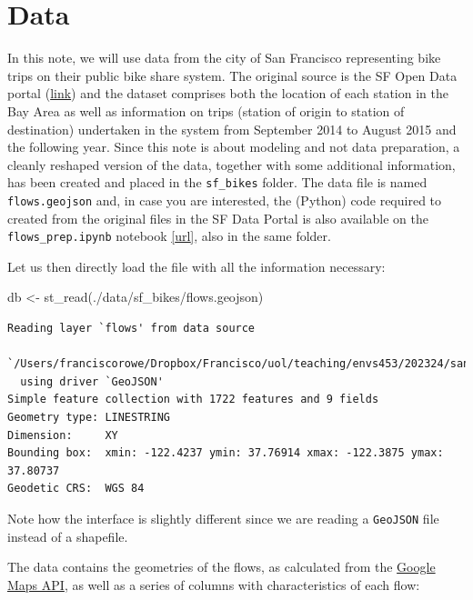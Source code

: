 \documentclass[
  letterpaper,
  DIV=11,
  numbers=noendperiod,
  oneside]{scrreprt}
\newenvironment{Shaded}{\begin{snugshade}}{\end{snugshade}}
\newcommand{\FunctionTok}[1]{\textcolor[rgb]{0.28,0.35,0.67}{#1}}
\newcommand{\NormalTok}[1]{\textcolor[rgb]{0.00,0.23,0.31}{#1}}
\newcommand{\OtherTok}[1]{\textcolor[rgb]{0.00,0.23,0.31}{#1}}
\newcommand{\StringTok}[1]{\textcolor[rgb]{0.13,0.47,0.30}{#1}}
\begin{document}
\section{Data}\label{data-1}

In this note, we will use data from the city of San Francisco
representing bike trips on their public bike share system. The original
source is the SF Open Data portal
(\href{http://www.bayareabikeshare.com/open-data}{link}) and the dataset
comprises both the location of each station in the Bay Area as well as
information on trips (station of origin to station of destination)
undertaken in the system from September 2014 to August 2015 and the
following year. Since this note is about modeling and not data
preparation, a cleanly reshaped version of the data, together with some
additional information, has been created and placed in the
\texttt{sf\_bikes} folder. The data file is named \texttt{flows.geojson}
and, in case you are interested, the (Python) code required to created
from the original files in the SF Data Portal is also available on the
\texttt{flows\_prep.ipynb} notebook
\href{https://github.com/darribas/spa_notes/blob/master/sf_bikes/flows_prep.ipynb}{{[}url{]}},
also in the same folder.

Let us then directly load the file with all the information necessary:

\begin{Shaded}
\begin{Highlighting}[]
\NormalTok{db }\OtherTok{\textless{}{-}} \FunctionTok{st\_read}\NormalTok{(}\StringTok{\textquotesingle{}./data/sf\_bikes/flows.geojson\textquotesingle{}}\NormalTok{)}
\end{Highlighting}
\end{Shaded}

\begin{verbatim}
Reading layer `flows' from data source 
  `/Users/franciscorowe/Dropbox/Francisco/uol/teaching/envs453/202324/san/data/sf_bikes/flows.geojson' 
  using driver `GeoJSON'
Simple feature collection with 1722 features and 9 fields
Geometry type: LINESTRING
Dimension:     XY
Bounding box:  xmin: -122.4237 ymin: 37.76914 xmax: -122.3875 ymax: 37.80737
Geodetic CRS:  WGS 84
\end{verbatim}

Note how the interface is slightly different since we are reading a
\texttt{GeoJSON} file instead of a shapefile.

The data contains the geometries of the flows, as calculated from the
\href{https://developers.google.com/maps/}{Google Maps API}, as well as
a series of columns with characteristics of each flow:
\end{document}
